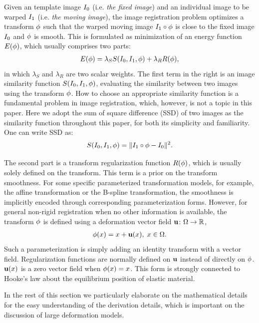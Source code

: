 \documentclass[letterpaper,12pt]{article}
\begin{document}
Given an template image $I_0$ (i.e. \textit{the fixed image}) and an
individual image to be warped $I_1$ (i.e. \textit{the moving image}),
the image registration problem optimizes a transform $\phi$ such
that the warped moving image $I_1 \circ \phi$ is close to the fixed image $I_0$ and $\phi$ is smooth. 
This is formulated as minimization of an energy function
$E(\phi)$, which usually comprises two parts:
\begin{align}
\label{eq:energy}
E(\phi) = \lambda_S S(I_0,I_1,\phi) + \lambda_R R(\phi),
\end{align}
in which $\lambda_S$ and $\lambda_R$ are two scalar weights. The first term in the right is an image similarity function $S(I_0, I_1, \phi)$, evaluating the similarity between two images using the transform $\phi$. 
How to choose an appropriate similarity function is a fundamental problem in image registration, which, however, is not a topic in this paper. 
Here we adopt the sum of square difference (SSD) of two images as the
similarity function throughout this paper, for both its simplicity and
familiarity. One can write SSD as:
\begin{align}
S(I_0, I_1, \phi) = \| I_1 \circ \phi - I_0 \|^2.
\label{eq:SSD}
\end{align}

The second part is a transform regularization function $R(\phi)$,
which is usually solely defined on the transform. This term is a prior
on the transform smoothness. For some specific parameterized transformation models, for example, the affine transformation or the B-spline transformation, the smoothness is implicitly encoded through corresponding parameterization forms. 
However, for general non-rigid registration when no other information is available, the transform $\phi$ is defined using a deformation vector field $\mathbf{u}$: $\Omega \to \mathbb{R}$,
\begin{align}
\phi(x) = x + \mathbf{u}(x), \; x \in \Omega.
\end{align}
Such a parameterization is simply adding an identity transform with a vector field. 
Regularization functions are normally defined on $\mathbf{u}$ instead of directly on $\phi$.
$\mathbf{u}(x)$ is a zero vector field when $\phi(x)=x$. 
This form is strongly connected to Hooke's law about the equilibrium position of elastic material.

In the rest of this section we particularly elaborate on the mathematical details for the easy understanding of the derivation details, which is important on the discussion of large deformation models.
\end{document}
